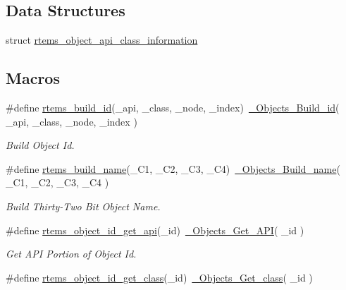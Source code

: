 \subsection*{Data Structures}
\begin{DoxyCompactItemize}
\item 
struct \mbox{\hyperlink{structrtems__object__api__class__information}{rtems\+\_\+object\+\_\+api\+\_\+class\+\_\+information}}
\end{DoxyCompactItemize}
\subsection*{Macros}
\begin{DoxyCompactItemize}
\item 
\#define \mbox{\hyperlink{group__ClassicClassInfo_ga6c3c828870cc1e78052df96725967a87}{rtems\+\_\+build\+\_\+id}}(\+\_\+api,  \+\_\+class,  \+\_\+node,  \+\_\+index)~\mbox{\hyperlink{group__RTEMSScoreObject_ga96bdcf529c56b52cab7504a171d26211}{\+\_\+\+Objects\+\_\+\+Build\+\_\+id}}( \+\_\+api, \+\_\+class, \+\_\+node, \+\_\+index )
\begin{DoxyCompactList}\small\item\em Build Object Id. \end{DoxyCompactList}\item 
\#define \mbox{\hyperlink{group__ClassicClassInfo_ga3f71442fa9093ffaa102cde5dcbd7daf}{rtems\+\_\+build\+\_\+name}}(\+\_\+\+C1,  \+\_\+\+C2,  \+\_\+\+C3,  \+\_\+\+C4)~\mbox{\hyperlink{group__RTEMSScoreObject_gae3e280cefdc786f588987d25c262c103}{\+\_\+\+Objects\+\_\+\+Build\+\_\+name}}( \+\_\+\+C1, \+\_\+\+C2, \+\_\+\+C3, \+\_\+\+C4 )
\begin{DoxyCompactList}\small\item\em Build Thirty-\/\+Two Bit Object Name. \end{DoxyCompactList}\item 
\#define \mbox{\hyperlink{group__ClassicClassInfo_ga8eaead233ac75fec14889179a4131bd9}{rtems\+\_\+object\+\_\+id\+\_\+get\+\_\+api}}(\+\_\+id)~\mbox{\hyperlink{group__RTEMSScoreObject_ga907a0412d7c657fa047641444090fe7b}{\+\_\+\+Objects\+\_\+\+Get\+\_\+\+A\+PI}}( \+\_\+id )
\begin{DoxyCompactList}\small\item\em Get A\+PI Portion of Object Id. \end{DoxyCompactList}\item 
\#define \mbox{\hyperlink{group__ClassicClassInfo_ga99ed333220b605c83b1c5ddfcedd9d87}{rtems\+\_\+object\+\_\+id\+\_\+get\+\_\+class}}(\+\_\+id)~\mbox{\hyperlink{group__RTEMSScoreObject_ga450c379424f26235d60f702638d229fa}{\+\_\+\+Objects\+\_\+\+Get\+\_\+class}}( \+\_\+id )

\end{DoxyCompactItemize}
